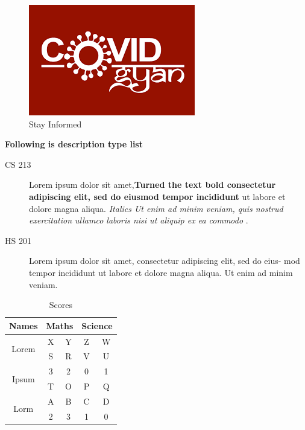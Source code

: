 \documentclass[10pt, a4paper]{article}
\begin{document}
\begin{figure}
	\includegraphics[scale=0.22]{cov}
	\centering
	\caption{Stay Informed}
	\label{fig:inf}
\end{figure}
\textbf{Following is description type list}
\begin{description}
	\item [CS 213] Lorem ipsum dolor sit amet,\textbf{Turned the text bold consectetur adipiscing elit, sed do eiusmod tempor incididunt} ut labore et dolore magna aliqua. \textit{Italics Ut enim ad minim veniam, quis nostrud
	exercitation ullamco laboris nisi ut aliquip ex ea commodo} . 
	\item [HS 201] Lorem ipsum dolor sit amet, consectetur adipiscing elit, sed do eius-
	mod tempor incididunt ut labore et dolore magna aliqua. Ut enim ad
	minim veniam.
\end{description}
\newpage
\pagecolor{green}
\begin{table}
	\centering
	\begin{tabular}{|c|c|c|c|c|}
		\hline
		Names & \multicolumn{2}{c|}{Maths}  & \multicolumn{2}{c|}{Science} \\
		\hline
		\multirow{2}{*}{Lorem} & X & Y & Z & W \\
				\cline{2-5}
		                       & S & R & V & U \\
		\hline
		\multirow{2}{*}{Ipsum} & 3 & 2 & 0 & 1 \\
		\cline{2-5}
		                       & T & O & P & Q \\
		\hline
		\multirow{2}{*}{Lorm}  & A & B & C & D \\
		\cline{2-5}
		                       & 2 & 3 & 1 & 0 \\
		\hline
	\end{tabular}
\caption{Scores}
\label{tab:scores}
\end{table}
\end{document}
